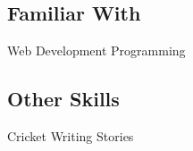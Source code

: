 \documentclass[]{deedy-resume-openfont}
\begin{document}
\begin{minipage}[t]{0.33\textwidth}
\sectionsep

\subsection{Familiar With}
 Web Development  \textbullet{} Programming \\
\sectionsep

\subsection{Other Skills}
  \textbullet{}Cricket \textbullet{} Writing Stories
\sectionsep

%
%

\end{minipage} 
\hfill
\end{document}
